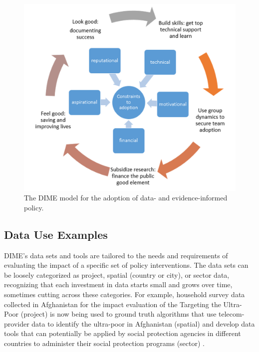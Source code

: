 \begin{figure}
\includegraphics[width=1\linewidth]{./figures/dimefigure2} \caption{The DIME model for the adoption of data- and evidence-\linebreak[2]informed policy.}\label{fig:dimefigure2}
\end{figure}

\hypertarget{data-use-examples-6}{%
\subsection{Data Use Examples}\label{data-use-examples-6}}

DIME's data sets and tools are tailored to the needs and requirements of evaluating the impact of a specific set of policy interventions. The data sets can be loosely categorized as project, spatial (country or city), or sector data, recognizing that each investment in data starts small and grows over time, sometimes cutting across these categories. For example, household survey data collected in Afghanistan for the impact evaluation of the Targeting the Ultra-Poor (project) is now being used to ground truth algorithms that use telecom-provider data to identify the ultra-poor in Afghanistan (spatial) and develop data tools that can potentially be applied by social protection agencies in different countries to administer their social protection programs (sector) \citep[see][]{aiken2020}.


